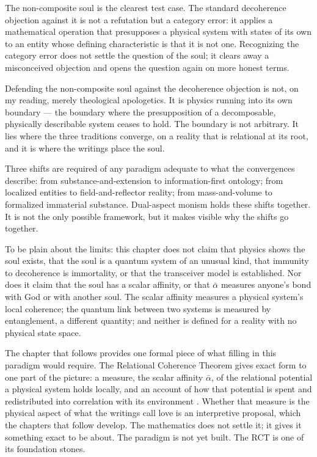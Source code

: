 The non-composite soul is the clearest test case. The standard decoherence
objection against it is not a refutation but a category error: it applies a
mathematical operation that presupposes a physical system with states of its
own to an entity whose defining characteristic is that it is not one. Recognizing the
category error does not settle the question of the soul; it clears away a
misconceived objection and opens the question again on more honest terms.

Defending the non-composite soul against the decoherence objection is not, on
my reading, merely theological apologetics. It is physics running into its own
boundary --- the boundary where the presupposition of a decomposable, physically
describable system ceases to hold. The boundary is not arbitrary. It lies where
the three traditions converge, on a reality that is relational at its root, and
it is where the \bahai writings place the soul.

Three shifts are required of any paradigm adequate to what the convergences
describe: from substance-and-extension to information-first ontology; from
localized entities to field-and-reflector reality; from mass-and-volume to
formalized immaterial substance. Dual-aspect monism holds these shifts
together. It is not the only possible framework, but it makes visible why the
shifts go together.

To be plain about the limits: this chapter does not claim that physics shows
the soul exists, that the soul is a quantum system of an
unusual kind, that immunity to decoherence is immortality, or that the
transceiver model is established. Nor does it claim that the soul has a scalar
affinity, or that $\bar{\alpha}$ measures anyone's bond with God or with another
soul. The scalar affinity measures a physical system's local coherence; the
quantum link between two systems is measured by entanglement, a different
quantity; and neither is defined for a reality with no physical state space.

The chapter that follows provides one formal piece of what filling in this
paradigm would require. The Relational Coherence Theorem gives exact form to one
part of the picture: a measure, the scalar affinity $\bar{\alpha}$, of the
relational potential a physical system holds locally, and an account of how
that potential is spent and redistributed into correlation with its environment
\citep{AdamsRCT}. Whether that measure is the physical aspect of what the
\bahai writings call love is an interpretive proposal, which the chapters that
follow develop. The mathematics does not settle it; it gives it something exact
to be about. The paradigm is not yet built. The RCT is one of its foundation
stones.

